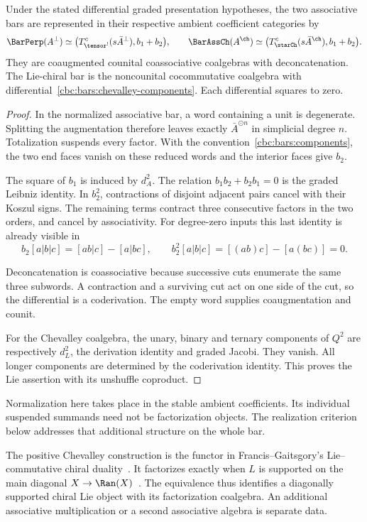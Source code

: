 \begin{theorem}\label{cbc:bars:typed}
Under the stated differential graded presentation hypotheses, the two associative bars are represented in their respective ambient coefficient categories by
\[
 \BarPerp(A^\perp)\simeq
 \bigl(T^c_{\tensor^!}(s\bar A^\perp),b_1+b_2\bigr),
 \qquad
 \BarAssCh(A^{\ch})\simeq
 \bigl(T^c_{\starCh}(s\bar A^{\ch}),b_1+b_2\bigr).
\]
They are coaugmented counital coassociative coalgebras with deconcatenation. The Lie-chiral bar is the noncounital cocommutative coalgebra with differential~\eqref{cbc:bars:chevalley-components}. Each differential squares to zero.
\end{theorem}
\begin{proof}
In the normalized associative bar, a word containing a unit is degenerate. Splitting the augmentation therefore leaves exactly $\bar A^{\odot n}$ in simplicial degree $n$. Totalization suspends every factor. With the convention~\eqref{cbc:bars:components}, the two end faces vanish on these reduced words and the interior faces give $b_2$.

The square of $b_1$ is induced by $d_A^2$. The relation $b_1b_2+b_2b_1=0$ is the graded Leibniz identity. In $b_2^2$, contractions of disjoint adjacent pairs cancel with their Koszul signs. The remaining terms contract three consecutive factors in the two orders, and cancel by associativity. For degree-zero inputs this last identity is already visible in
\[
 b_2[a|b|c]=[ab|c]-[a|bc],\qquad
 b_2^2[a|b|c]=[(ab)c]-[a(bc)]=0.
\]

Deconcatenation is coassociative because successive cuts enumerate the same three subwords. A contraction and a surviving cut act on one side of the cut, so the differential is a coderivation. The empty word supplies coaugmentation and counit.

For the Chevalley coalgebra, the unary, binary and ternary components of $Q^2$ are respectively $d_L^2$, the derivation identity and graded Jacobi. They vanish. All longer components are determined by the coderivation identity. This proves the Lie assertion with its unshuffle coproduct.
\end{proof}

Normalization here takes place in the stable ambient coefficients. Its individual suspended summands need not be factorization objects. The realization criterion below addresses that additional structure on the whole bar.

The positive Chevalley construction is the functor in Francis--Gaitsgory's Lie--commutative chiral duality~\cite[\S4.3 and Theorem~5.1.1]{FG12}. It factorizes exactly when $L$ is supported on the main diagonal $X\to\Ran(X)$~\cite[Theorem~5.2.1]{FG12}. The equivalence thus identifies a diagonally supported chiral Lie object with its factorization coalgebra. An additional associative multiplication or a second associative algebra is separate data.

